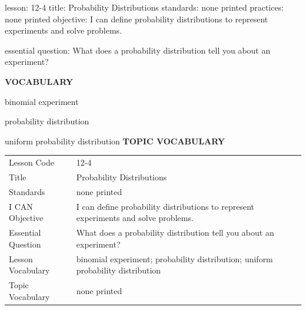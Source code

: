 \documentclass{article}
\newenvironment{lesson-meta}{}{}        %
\newcommand{\te}[1]{}                   %
\begin{document}
\begin{lesson-meta}
lesson: 12-4
title: Probability Distributions
standards: none printed
practices: none printed
objective: I can define probability distributions to represent experiments and solve problems.

essential question: What does a probability distribution tell you about an experiment?

\textbf{VOCABULARY}
\item binomial experiment
\item probability distribution
\item uniform probability distribution
\textbf{TOPIC VOCABULARY}
\te{No separate topic vocabulary list is printed on these pages.}
\begin{tabular}{ll}
Lesson Code & 12-4 \\
Title & Probability Distributions \\
Standards & none printed \\
I CAN Objective & I can define probability distributions to represent experiments and solve problems. \\
Essential Question & What does a probability distribution tell you about an experiment? \\
Lesson Vocabulary & binomial experiment; probability distribution; uniform probability distribution \\
Topic Vocabulary & none printed \\
\end{tabular}
\end{lesson-meta}
\end{document}
